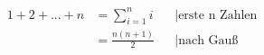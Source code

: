 \begin{align*}
	1+2+...+n 
	&= \sum_{i=1}^n i
	&& \text{|erste n Zahlen}\\
	&= \frac{n(n+1)}{2}
	&& \text{|nach Gauß}
\end{align*}